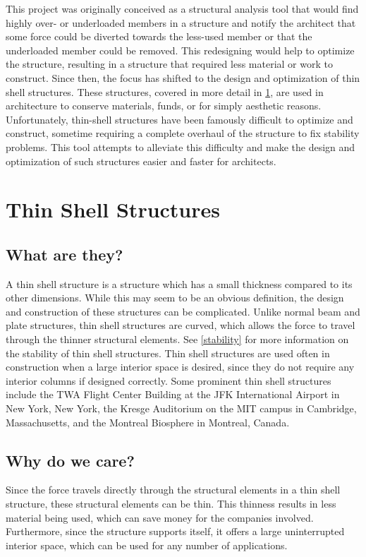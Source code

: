 \documentclass{thesis}
\begin{document}
This project was originally conceived as a structural analysis tool that would find highly over- or underloaded members in a structure
and notify the architect that some force could be diverted towards the less-used member or that the underloaded member could be
removed.  This redesigning would help to optimize the structure, resulting in a structure that required less material or work to construct.
Since then, the focus has shifted to the design and optimization of thin shell structures.  These structures, covered in more detail in
\ref{thinshell}, are used in architecture to conserve materials, funds, or for simply aesthetic reasons.  Unfortunately, thin-shell
structures have been famously difficult to optimize and construct, sometime requiring a complete overhaul of the structure to fix stability
problems. This tool attempts to alleviate this difficulty and make the design and optimization of such structures easier and faster for architects.

\section{Thin Shell Structures} \label{thinshell}

\subsection{What are they?}
A thin shell structure is a structure which has a small thickness compared to its other dimensions.  While this may seem to be
an obvious definition, the design and construction of these structures can be complicated.  Unlike normal beam and plate structures,
thin shell structures are curved, which allows the force to travel through the thinner structural elements.  See \ref{stability} for
more information on the stability of thin shell structures.  Thin shell structures are used often in construction when a large interior
space is desired, since they do not require any interior columns if designed correctly.  Some prominent thin shell structures include
the TWA Flight Center Building at the JFK International Airport in New York, New York, the Kresge Auditorium on the MIT campus in
Cambridge, Massachusetts, and the Montreal Biosphere in Montreal, Canada.

\subsection{Why do we care?}
Since the force travels directly through the structural elements in a thin shell structure, these structural elements can be thin.  This
thinness results in less material being used, which can save money for the companies involved.  Furthermore, since the structure supports
itself, it offers a large uninterrupted interior space, which can be used for any number of applications.
\end{document}
